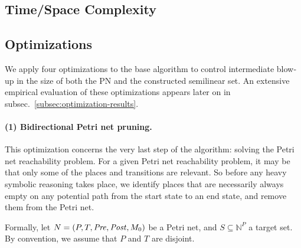





\subsection{Time/Space Complexity}



\subsection{Optimizations}
\label{sec:optimizations}


We apply four optimizations to the base algorithm to control intermediate blow‐up in the size of both the PN and the constructed semilinear set. 
%
An extensive empirical evaluation of these optimizations appears later on in subsec.~\ref{subsec:optimization-results}.

\paragraph{(1) Bidirectional Petri net pruning.}  
This optimization concerns the very last step of the algorithm: solving the Petri net reachability problem.
For a given Petri net reachability problem, it may be that only some of the places and transitions are relevant.
So before any heavy symbolic reasoning takes place, we identify places that are necessarily always empty on any potential path from the start state to an end state, and remove them from the Petri net.

Formally, let $N=(P,T,\mathit{Pre},\mathit{Post},M_0)$ be a Petri net, and $S\subseteq\mathbb{N}^P$ a target set. By convention, we assume that $P$ and $T$ are disjoint.

